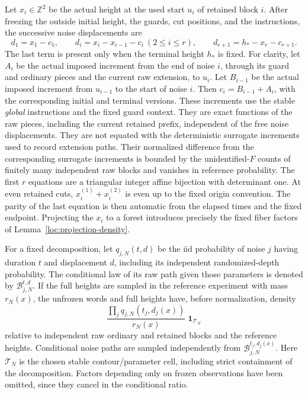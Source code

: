 

Let $x_i\in\mathbb Z^2$ be the actual height at the used start $u_i$
of retained block $i$.
After freezing the outside initial height, the guards, cut positions,
and the instructions, the successive noise displacements are
\begin{equation}\label{loc:triangular-map}
 d_1=x_1-c_1,\qquad
 d_i=x_i-x_{i-1}-c_i\ (2\le i\le r),\qquad
 d_{r+1}=h_*-x_r-c_{r+1}.
\end{equation}
The last term is present only when the terminal height $h_*$ is fixed.
For clarity, let $A_i$ be the actual imposed increment from the end of
noise $i$, through its guard and ordinary pieces and the current raw
extension, to $u_i$.  Let $B_{i-1}$ be the actual imposed increment from
$u_{i-1}$ to the start of noise $i$.  Then
$c_i=B_{i-1}+A_i$, with the corresponding initial and terminal versions.
These increments use the stable \emph{global} instructions and the
fixed guard context.  They are exact functions of the raw pieces,
including the current retained prefix, independent of the free noise
displacements.  They are not equated with the deterministic surrogate
increments used to record extension paths.  Their normalized difference
from the corresponding surrogate increments is bounded by the
unidentified-$F$ counts of finitely many independent raw blocks and
vanishes in reference probability.  The first
$r$ equations are a triangular integer affine bijection with determinant
one.  At even retained cuts, $x_i^{(1)}+x_i^{(2)}$ is even up to the
fixed origin convention.  The parity of the last equation is then
automatic from the elapsed times and the fixed endpoint.  Projecting the
$x_i$ to a forest introduces precisely the fixed fiber factors of
Lemma~\ref{loc:projection-density}.

For a fixed decomposition, let $q_{j,N}(t,d)$ be the iid probability of
noise $j$ having duration $t$ and displacement $d$, including its
independent randomized-depth probability.  The conditional law of its
raw path given those parameters is denoted by $\mathcal B_{j,N}^{t,d}$.
If the full heights are sampled in the reference experiment with mass
$r_N(x)$, the unfrozen words and full heights have, before normalization,
density
\begin{equation}\label{loc:exact-density}
 \frac{\prod_j q_{j,N}(t_j,d_j(x))}{r_N(x)}
 \;\mathbf 1_{\mathcal T_N}
\end{equation}
relative to independent raw ordinary and retained blocks and the
reference heights.  Conditional noise paths are sampled independently
from $\mathcal B_{j,N}^{t_j,d_j(x)}$.  Here $\mathcal T_N$ is the
chosen stable contour/parameter cell, including strict containment of
the decomposition.  Factors depending only on frozen observations have
been omitted, since they cancel in the conditional ratio.

